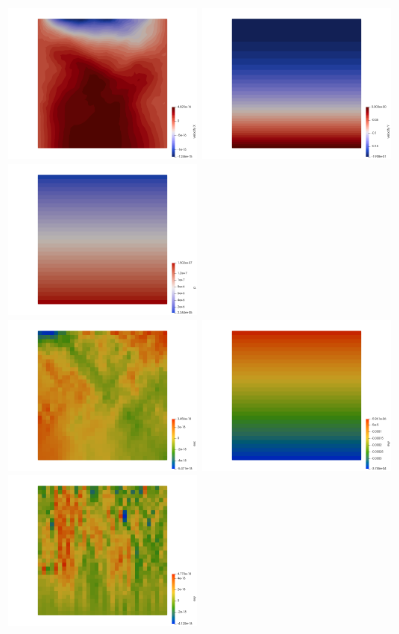 \begin{center}
\includegraphics[width=5cm]{python_codes/fieldstone_34/results/u}
\includegraphics[width=5cm]{python_codes/fieldstone_34/results/v}
\includegraphics[width=5cm]{python_codes/fieldstone_34/results/p}\\
\includegraphics[width=5cm]{python_codes/fieldstone_34/results/exx}
\includegraphics[width=5cm]{python_codes/fieldstone_34/results/eyy}
\includegraphics[width=5cm]{python_codes/fieldstone_34/results/exy}
\end{center}

